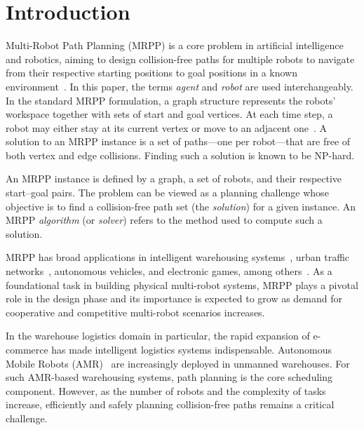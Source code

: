 \documentclass[conference]{IEEEtran}
\begin{document}
\section{Introduction}

Multi-Robot Path Planning (MRPP) is a core problem in artificial
intelligence and robotics, aiming to design collision-free paths
for multiple robots to navigate from their respective starting
positions to goal positions in a known environment~\cite{wang2023scrimp}.
In this paper, the terms \emph{agent} and \emph{robot} are used
interchangeably.
In the standard MRPP formulation, a graph structure represents the
robots' workspace together with sets of start and goal
vertices.
At each time step, a robot may either stay at its current vertex
or move to an adjacent one~\cite{li2021lifelong}.
A solution to an MRPP instance is a set of paths—one per robot—that
are free of both vertex and edge collisions.
Finding such a solution is known to be NP-hard.

An MRPP instance is defined by a graph, a set of robots, and their
respective start–goal pairs.
The problem can be viewed as a planning challenge whose objective
is to find a collision-free path set (the \emph{solution}) for a
given instance.
An MRPP \emph{algorithm} (or \emph{solver}) refers to the method
used to compute such a solution.

MRPP has broad applications in intelligent warehousing
systems~\cite{zhang2023warehouse}, urban traffic
networks~\cite{dresner2008multiagent}, autonomous
vehicles, and electronic games, among
others~\cite{ma2022graph}.
As a foundational task in building physical multi-robot systems,
MRPP plays a pivotal role in the design phase and its importance
is expected to grow as demand for cooperative and competitive
multi-robot scenarios increases.


In the warehouse logistics domain in particular, the rapid
expansion of e-commerce has made intelligent logistics systems
indispensable.
Autonomous Mobile Robots (AMR)~\cite{tamura2025human} are
increasingly deployed in unmanned warehouses.
For such AMR-based warehousing systems, path planning is the core
scheduling component.
However, as the number of robots and the complexity of tasks
increase, efficiently and safely planning collision-free paths
remains a critical challenge.
\end{document}
